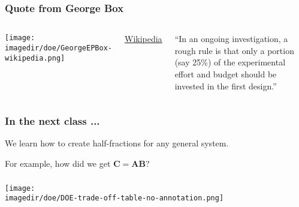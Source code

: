 \documentclass[handout,11pt,aspectratio=169,mathserif]{beamer}
\begin{document}
\begin{frame}\frametitle{Quote from George Box}
	\begin{columns}[T]
			\texttt{[image: \\imagedir/doe/GeorgeEPBox-wikipedia.png]}
		
			{\tiny \href{https://en.wikiquote.org/wiki/George\_E.\_P.\_Box}{Wikipedia}}
		
			``In an ongoing investigation, a rough rule is that only a portion (say 25\%) of the experimental effort and budget should be invested in the first design.''
	\end{columns}	
\end{frame}

\begin{frame}\frametitle{In the next class ...}
	We learn how to create half-fractions for any general system.
	
	\vspace{2cm}
	For example, how did we get $\mathbf{C = AB}$?
\end{frame}




%
%
%
%
%
%
%
%
%

\begin{frame}\frametitle{}
	\begin{center}
	\texttt{[image: \\imagedir/doe/DOE-trade-off-table-no-annotation.png]}
	\end{center}
\end{frame}
\end{document}

